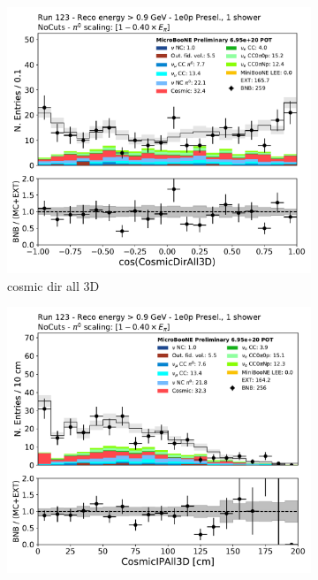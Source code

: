 \begin{figure}[H]
    \centering
    \begin{subfigure}{0.3\textwidth}
    \includegraphics[width=1.0\textwidth]{1e0p/High_E_Sideband/CosmicDirAll3D.pdf}
    \caption{cosmic dir all 3D}
    \end{subfigure}
    \begin{subfigure}{0.3\textwidth}
    \includegraphics[width=1.0\textwidth]{1e0p/High_E_Sideband/CosmicIPAll3D.pdf}

\end{subfigure}
\end{figure}
